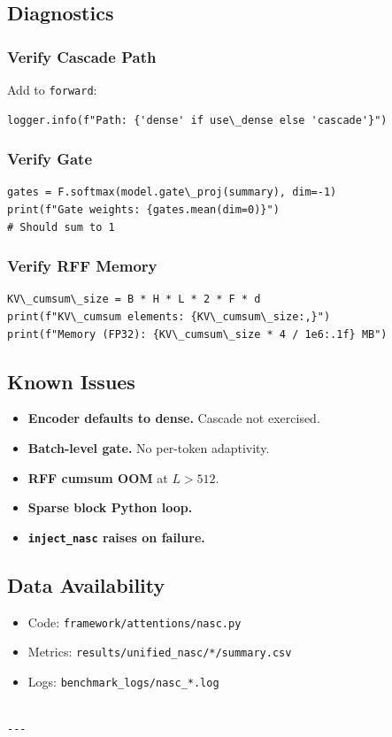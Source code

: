 \subsection{Diagnostics}

\subsubsection{Verify Cascade Path}

Add to \texttt{forward}:

\begin{lstlisting}
logger.info(f"Path: {'dense' if use\_dense else 'cascade'}")
\end{lstlisting}

\subsubsection{Verify Gate}

\begin{lstlisting}
gates = F.softmax(model.gate\_proj(summary), dim=-1)
print(f"Gate weights: {gates.mean(dim=0)}")
# Should sum to 1
\end{lstlisting}

\subsubsection{Verify RFF Memory}

\begin{lstlisting}
KV\_cumsum\_size = B * H * L * 2 * F * d
print(f"KV\_cumsum elements: {KV\_cumsum\_size:,}")
print(f"Memory (FP32): {KV\_cumsum\_size * 4 / 1e6:.1f} MB")
\end{lstlisting}

\subsection{Known Issues}

\begin{itemize}
\item \textbf{Encoder defaults to dense.} Cascade not exercised.
\item \textbf{Batch-level gate.} No per-token adaptivity.
\item \textbf{RFF cumsum OOM} at $L > 512$.
\item \textbf{Sparse block Python loop.}
\item \textbf{\texttt{inject\_nasc} raises on failure.}

\end{itemize}
\subsection{Data Availability}

\begin{itemize}
\item Code: \texttt{framework/attentions/nasc.py}
\item Metrics: \texttt{results/unified\_nasc/*/summary.csv}
\item Logs: \texttt{benchmark\_logs/nasc\_*.log}
\end{itemize}
\begin{lstlisting}

---
\end{lstlisting}
